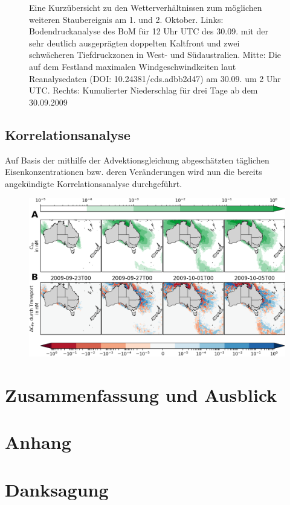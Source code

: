 \documentclass[12pt,a4paper,onecolumn]{scrartcl}
\begin{document}
\begin{figure}
\begin{minipage}[c]{0.33\textwidth}
	\end{minipage}\hfill
	\caption{Eine Kurzübersicht zu den Wetterverhältnissen zum möglichen weiteren Staubereignis am 1. und 2. Oktober. Links: Bodendruckanalyse des BoM für 12 Uhr UTC des 30.09. mit der sehr deutlich ausgeprägten doppelten Kaltfront und zwei schwächeren Tiefdruckzonen in West- und Südaustralien. Mitte: Die auf dem Festland maximalen Windgeschwindkeiten laut Reanalysedaten (DOI: 10.24381/cds.adbb2d47) am 30.09. um 2 Uhr UTC. Rechts: Kumulierter Niederschlag für drei Tage ab dem 30.09.2009} \label{fig:october_weather}
\end{figure}
\subsection{Korrelationsanalyse} \label{sec:correlation_analysis}
Auf Basis der mithilfe der Advektionsgleichung abgeschätzten täglichen Eisenkonzentrationen bzw. deren Veränderungen wird nun die bereits angekündigte Korrelationsanalyse durchgeführt.
\begin{figure}
\includegraphics[width=\textwidth]{bilder/iron_transport.png}
\caption{} \label{fig:iron_transport}
\end{figure}
\section{Zusammenfassung und Ausblick}
\newpage
\printbibliography
\appendix
\section{Anhang}

\section{Danksagung}
\nocite{*}
\end{document}
